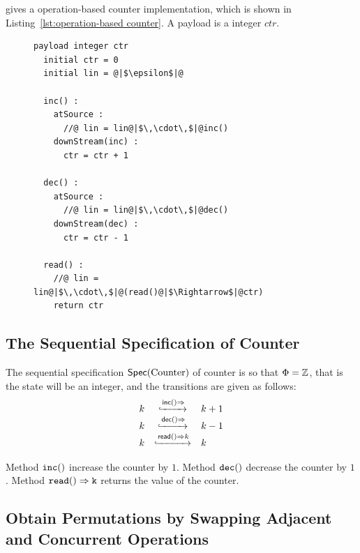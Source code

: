 \cite{ShapiroPBZ11} gives a operation-based counter implementation, which is shown in Listing~\ref{lst:operation-based counter}. A payload is a integer $ctr$.

\begin{figure}[t]
\begin{lstlisting}[frame=top,caption={Pseudo-code of operation-based counter},
captionpos=b,label={lst:operation-based counter}]
  payload integer ctr
  initial ctr = 0
  initial lin = @|$\epsilon$|@

  inc() :
    atSource :
      //@ lin = lin@|$\,\cdot\,$|@inc()
    downStream(inc) :
      ctr = ctr + 1

  dec() :
    atSource :
      //@ lin = lin@|$\,\cdot\,$|@dec()
    downStream(dec) :
      ctr = ctr - 1

  read() :
    //@ lin = lin@|$\,\cdot\,$|@(read()@|$\Rightarrow$|@ctr)
    return ctr
\end{lstlisting}
\end{figure}




\subsection{The Sequential Specification of Counter}
\label{subsec:the sequential specification of counter}

The sequential specification $\specCounter$ of counter is so that $\abstates = \mathbb{Z}$, that is the state will be an integer, and the transitions are given as follows:
\[
  \begin{array}[rcl]{rcl}
    k & \specarrow{\alabellong[\mathsf{inc}]{}{}} & k+1\\
    k & \specarrow{\alabellong[\mathsf{dec}]{}{}} & k-1\\
    k & \specarrow{\alabellong[\mathsf{read}]{}{k}} & k
  \end{array}
\]

Method $\alabelshort[{\tt inc}]{}$ increase the counter by $1$. Method $\alabelshort[{\tt dec}]{}$ decrease the counter by $1$. Method $\alabellong[{\tt read}]{}{k}{}$ returns the value of the counter.




\subsection{Obtain Permutations by Swapping Adjacent and Concurrent Operations}
\label{subsec:obtain permutations by swapping adjacent and concurrent operations}

